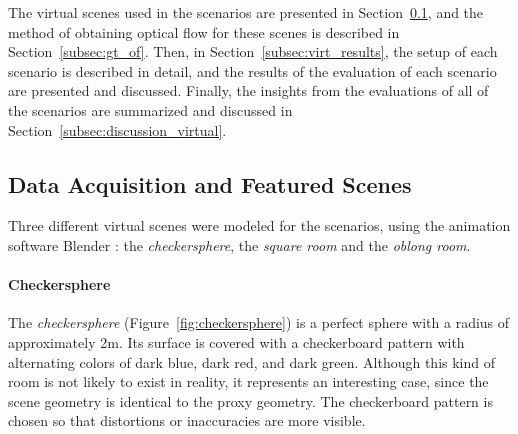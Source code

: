 
The virtual scenes used in the scenarios are presented in Section~\ref{subsec:data_acquisition}, and the method of obtaining optical flow for these scenes is described in Section~\ref{subsec:gt_of}. Then, in Section~\ref{subsec:virt_results}, the setup of each scenario is described in detail, and the results of the evaluation of each scenario are presented and discussed. Finally, the insights from the evaluations of all of the scenarios are summarized and discussed in Section~\ref{subsec:discussion_virtual}.


\subsection{Data Acquisition and Featured Scenes} \label{subsec:data_acquisition}


Three different virtual scenes were modeled for the scenarios, using the animation software Blender \cite{blender}: the \emph{checkersphere}, the \emph{square room} and the \emph{oblong room}.%

\paragraph{Checkersphere}
The \emph{checkersphere} (Figure~\ref{fig:checkersphere}) is a perfect sphere with a radius of approximately 2m. Its surface is covered with a checkerboard pattern with alternating colors of dark blue, dark red, and dark green.
Although this kind of room is not likely to exist in reality, it represents an interesting case, since the scene geometry is identical to the proxy geometry. The checkerboard pattern is chosen so that distortions or inaccuracies are more visible.

